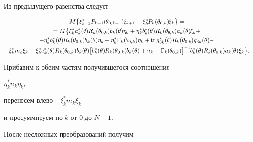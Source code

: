 Из предыдущего равенства следует


\begin{gather*}


M\bigl\{\xi_{k+1}^{*}P_{k+1}(\theta_{0,k+1})\xi_{k+1}-


\xi_{k}^{*}P_{k}(\theta_{0,k})\xi_{k}\bigr\}=\\


%


=M\bigl\{\xi_{k}^{*}a_{k}^{*}(\theta)R_{k}(\theta_{0,k})


b_{k}(\theta)\eta_{k}+


\eta_{k}^{*}b_{k}^{*}(\theta)R_{k}(\theta_{0,k})


a_{k}(\theta)\xi_{k}+ \\


%


+\eta_{k}^{*}b_{k}^{*}(\theta)R_{k}(\theta_{0,k})


b_{k}(\theta)\eta_{k}


+\eta_{k}^{*}\Gamma_{k}(\theta_{0,k})\eta_{k}+


\tr g_{3k}^{*}(\theta)R_{k}(\theta_{0,k})


g_{3k}(\theta)- \\


%


-\xi_{k}^{*}m_{k}\xi_{k}+\xi_{k}^{*}a_{k}^{*}(\theta)R_{k}(\theta_{0,k})


b_{k}(\theta)


\bigl[b_{k}^{*}(\theta)R_{k}(\theta_{0,k})


b_{k}(\theta)+n_{k}+\Gamma_{k}(\theta_{0,k})\bigr]^{-1}


b_{k}^{*}(\theta)R_{k}(\theta_{0,k})


a_{k}(\theta)\xi_{k}\bigr\}.


\end{gather*}


Прибавим к обеим частям получившегося соотношения 


$\eta_{k}^{*}n_{k}\eta_{k}$,


перенесем влево $-\xi_{k}^{*}m_{k}\xi_{k}$ 


и просуммируем по $k$ от 0 до $N-1$.


После несложных преобразований получим


